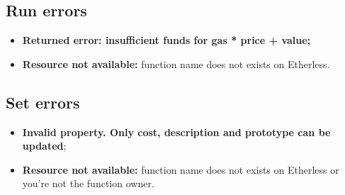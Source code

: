 \subsection{Run errors}
\begin{itemize}
	\item \textbf{Returned error: insufficient funds for gas * price + value;}
	\item \textbf{Resource not available:} function name does not exists on Etherless.
\end{itemize}
\subsection{Set errors}
\begin{itemize}
	\item \textbf{Invalid property. Only cost, description and prototype can be updated};
	\item \textbf{Resource not available:} function name does not exists on Etherless or you're not the function owner.
\end{itemize}


